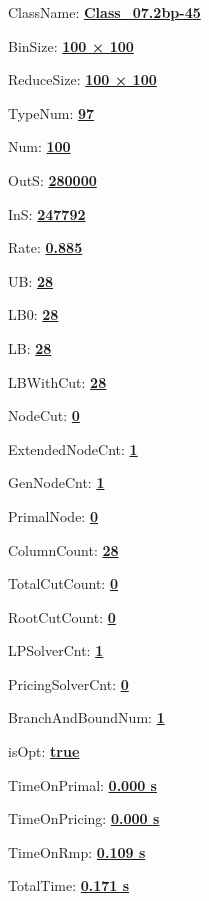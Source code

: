 \documentclass[11pt]{article}
\begin{document}
\pagestyle{empty}


ClassName: \underline{\textbf{Class_07.2bp-45}}
\par
BinSize: \underline{\textbf{100 × 100}}
\par
ReduceSize: \underline{\textbf{100 × 100}}
\par
TypeNum: \underline{\textbf{97}}
\par
Num: \underline{\textbf{100}}
\par
OutS: \underline{\textbf{280000}}
\par
InS: \underline{\textbf{247792}}
\par
Rate: \underline{\textbf{0.885}}
\par
UB: \underline{\textbf{28}}
\par
LB0: \underline{\textbf{28}}
\par
LB: \underline{\textbf{28}}
\par
LBWithCut: \underline{\textbf{28}}
\par
NodeCut: \underline{\textbf{0}}
\par
ExtendedNodeCnt: \underline{\textbf{1}}
\par
GenNodeCnt: \underline{\textbf{1}}
\par
PrimalNode: \underline{\textbf{0}}
\par
ColumnCount: \underline{\textbf{28}}
\par
TotalCutCount: \underline{\textbf{0}}
\par
RootCutCount: \underline{\textbf{0}}
\par
LPSolverCnt: \underline{\textbf{1}}
\par
PricingSolverCnt: \underline{\textbf{0}}
\par
BranchAndBoundNum: \underline{\textbf{1}}
\par
isOpt: \underline{\textbf{true}}
\par
TimeOnPrimal: \underline{\textbf{0.000 s}}
\par
TimeOnPricing: \underline{\textbf{0.000 s}}
\par
TimeOnRmp: \underline{\textbf{0.109 s}}
\par
TotalTime: \underline{\textbf{0.171 s}}
\par
\newpage


\end{document}
